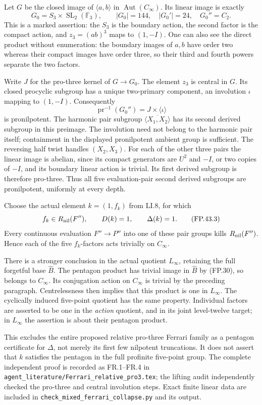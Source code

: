 Let $G$ be the closed image of $\langle a,b\rangle$ in
$\operatorname{Aut}(C_\infty)$. Its linear image is exactly
\[
 G_0=S_3\times\operatorname{SL}_2(\mathbb F_3),
 \qquad |G_0|=144,\quad |G_0'|=24,\quad G_0''=C_2.
 \tag{FP.43.2}
\]
This is a marked assertion: the $S_3$ is the boundary action,
the second factor is the compact action, and
$z_3=(ab)^3$ maps to $(1,-I)$.
One can also see the direct product without enumeration:
the boundary images of $a,b$ have order two whereas their
compact images have order three, so their third and fourth
powers separate the two factors.

Write $J$ for the pro-three kernel of $G\to G_0$.
The element $z_3$ is central in $G$. Its closed procyclic
subgroup has a unique two-primary component, an involution
$\iota$ mapping to $(1,-I)$. Consequently
\[
      \operatorname{pr}^{-1}(G_0'')
          =J\times\langle\iota\rangle
\]
is pronilpotent. The harmonic pair subgroup
$\overline{\langle X_1,X_2\rangle}$ has its second derived
subgroup in this preimage. The involution need not belong to
the harmonic pair itself; containment in the displayed
pronilpotent ambient group is sufficient. The reversing
half twist handles $(X_2,X_3)$. For each of the other three
pairs the linear image is abelian, since its compact generators
are $U^2$ and $-I$, or two copies of $-I$, and its boundary
linear action is trivial. Its first derived subgroup is
therefore pro-three. Thus all five evaluation-pair second
derived subgroups are pronilpotent, uniformly at every depth.

Choose the actual element $k=(1,f_k)$ from LI.8, for which
\[
 f_k\in R_{\rm nil}(F''),\qquad D(k)=1,
                   \qquad\Delta(k)=1.
 \tag{FP.43.3}
\]
Every continuous evaluation $F''\to P''$ into one of these
pair groups kills $R_{\rm nil}(F'')$. Hence each of the five
$f_k$-factors acts trivially on $C_\infty$.

There is a stronger conclusion in the actual quotient
$L_\infty$, retaining the full forgetful base $\widehat B$.
The pentagon product has trivial image in $\widehat B$ by
(FP.30), so belongs to $C_\infty$. Its conjugation action on
$C_\infty$ is trivial by the preceding paragraph. Centrelessness
then implies that this product is one in $L_\infty$.
The cyclically induced five-point quotient has the same
property. Individual factors are asserted to be one in the
\emph{action} quotient, and in its joint level-twelve target;
in $L_\infty$ the assertion is about their pentagon product.

This excludes the entire proposed relative pro-three Ferrari
family as a pentagon certificate for $\Delta$, not merely its
first few nilpotent truncations. It does not assert that $k$
satisfies the pentagon in the full profinite five-point group.
The complete independent proof is recorded as FR.1--FR.4 in
\texttt{agent\_literature/Ferrari\_relative\_pro3.tex}; the
lifting audit independently checked the pro-three and central
involution steps. Exact finite linear data are included in
\texttt{check\_mixed\_ferrari\_collapse.py} and its output.

